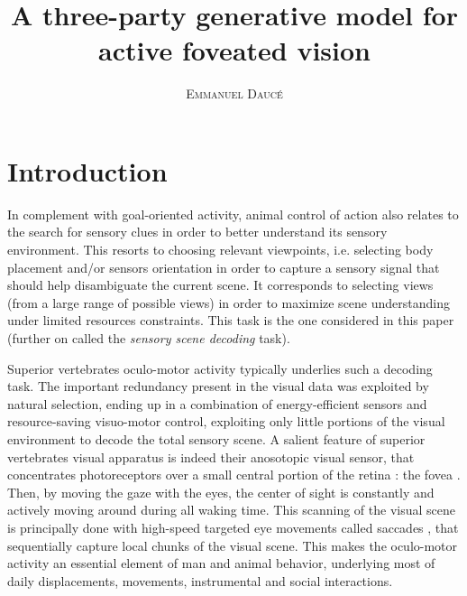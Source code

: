 \documentclass[12pt,twoside,openright]{article}
\title{\textbf{A three-party generative model for active foveated vision} }
\author{\textsc{Emmanuel Daucé}}%
\date{}
\begin{document}
	
\maketitle


	
\section{Introduction}

In complement with goal-oriented activity, animal control of action also relates to the search for sensory clues in order to better understand its sensory environment. This resorts to choosing relevant viewpoints, i.e. selecting body placement and/or sensors orientation in order to capture a sensory signal that should help disambiguate the current scene. It corresponds to selecting views (from a large range of possible views) in order to maximize scene understanding under limited resources constraints. This task is the one considered in this paper (further on called the \emph{sensory scene decoding} task). 


Superior vertebrates oculo-motor activity typically underlies such a decoding task. The important redundancy present in the visual data was exploited by natural selection, ending up in a combination of energy-efficient sensors and resource-saving visuo-motor control, exploiting only little portions of the visual environment to decode the total sensory scene. A salient feature of superior vertebrates visual apparatus is indeed their anosotopic visual sensor, that concentrates  photoreceptors over a small central portion of the retina : the fovea \cite{osterberg1935topography}. Then, by moving the gaze with the eyes, the center of sight is constantly and actively moving around during all waking time. 
This scanning of the visual scene is principally done with high-speed targeted eye movements called saccades \cite{yarbus1967eye}, that sequentially capture local chunks of the visual scene. This makes the oculo-motor activity an essential element of man and animal behavior, underlying most of daily displacements, movements, instrumental and social interactions. 
\end{document}
